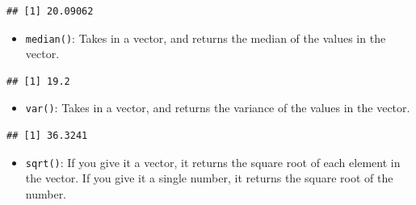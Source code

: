 \documentclass[
]{book}
\newenvironment{Shaded}{\begin{snugshade}}{\end{snugshade}}
\newcommand{\KeywordTok}[1]{\textcolor[rgb]{0.13,0.29,0.53}{\textbf{#1}}}
\newcommand{\NormalTok}[1]{#1}
\newcommand{\OperatorTok}[1]{\textcolor[rgb]{0.81,0.36,0.00}{\textbf{#1}}}
\providecommand{\tightlist}{%
  \setlength{\itemsep}{0pt}\setlength{\parskip}{0pt}}
\begin{document}
\begin{Shaded}
\end{Shaded}

\begin{verbatim}
## [1] 20.09062
\end{verbatim}

\begin{itemize}
\tightlist
\item
  \texttt{median()}: Takes in a vector, and returns the median of the values in the vector.
\end{itemize}

\begin{Shaded}
\end{Shaded}

\begin{verbatim}
## [1] 19.2
\end{verbatim}

\begin{itemize}
\tightlist
\item
  \texttt{var()}: Takes in a vector, and returns the variance of the values in the vector.
\end{itemize}

\begin{Shaded}
\end{Shaded}

\begin{verbatim}
## [1] 36.3241
\end{verbatim}

\begin{itemize}
\tightlist
\item
  \texttt{sqrt()}: If you give it a vector, it returns the square root of each element in the vector. If you give it a single number, it returns the square root of the number.
\end{itemize}

\begin{Shaded}
\end{Shaded}
\end{document}
